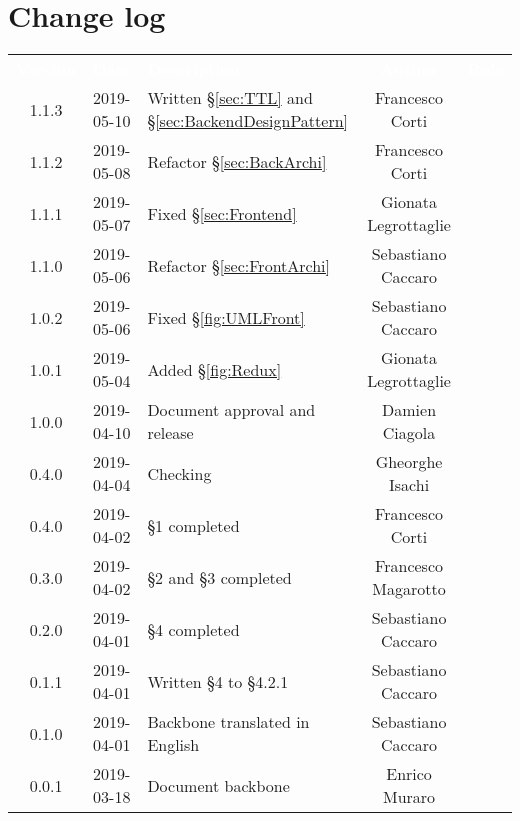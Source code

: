 \section*{Change log}
{
	\renewcommand{\arraystretch}{1.5}
	\centering
	\begin{longtable}{ c c C{6cm} c c }
		\textcolor{white}{\textbf{Version}} & \textcolor{white}{\textbf{Date}} & \textcolor{white}{\textbf{Description}} & \textcolor{white}{\textbf{Author}} & \textcolor{white}{\textbf{Role}}\\
		1.1.3 & 2019-05-10 & Written §\ref{sec:TTL} and §\ref{sec:BackendDesignPattern} & Francesco Corti & \reda{}\\
		1.1.2 & 2019-05-08 & Refactor §\ref{sec:BackArchi}  & Francesco Corti & \reda{}\\
		1.1.1 & 2019-05-07 & Fixed §\ref{sec:Frontend} & Gionata Legrottaglie & \reda{}\\
		1.1.0 & 2019-05-06 & Refactor §\ref{sec:FrontArchi} & Sebastiano Caccaro & \reda{}\\
		1.0.2 & 2019-05-06 & Fixed §\ref{fig:UMLFront} & Sebastiano Caccaro & \reda{}\\
		1.0.1 & 2019-05-04 & Added §\ref{fig:Redux} & Gionata Legrottaglie & \reda{}\\
		1.0.0 & 2019-04-10 & Document approval and release & Damien Ciagola & \RdP{}\\
		0.4.0 & 2019-04-04 & Checking & Gheorghe Isachi & \ver{}\\
		0.4.0 & 2019-04-02 & §1 completed  & Francesco Corti & \reda{}\\		
		0.3.0 & 2019-04-02 & §2 and §3 completed  & Francesco Magarotto & \reda{}\\				
		0.2.0 & 2019-04-01 & §4 completed  & Sebastiano Caccaro & \reda{}\\
		0.1.1 & 2019-04-01 & Written §4 to §4.2.1  & Sebastiano Caccaro & \reda{}\\
		0.1.0 & 2019-04-01 & Backbone translated in English & Sebastiano Caccaro & \reda{}\\
		0.0.1 & 2019-03-18 & Document backbone & Enrico Muraro & \reda{}\\
		
	\end{longtable}

}

